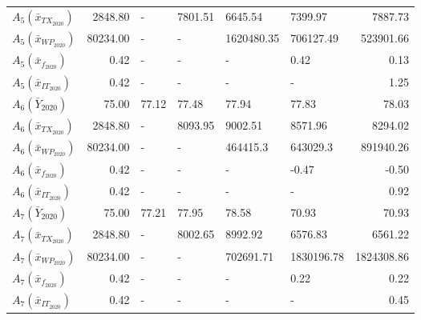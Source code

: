 \begin{tabular}{lrllllr}
 $A_{5}(\bar{x}_{TX_{2020}})$ &  2848.80 &                   - &             7801.51 &             6645.54 &             7399.97 &              7887.73 \\
 $A_{5}(\bar{x}_{WP_{2020}})$ & 80234.00 &                   - &                   - &          1620480.35 &           706127.49 &            523901.66 \\
  $A_{5}(\bar{x}_{f_{2020}})$ &     0.42 &                   - &                   - &                   - &                0.42 &                 0.13 \\
 $A_{5}(\bar{x}_{IT_{2020}})$ &     0.42 &                   - &                   - &                   - &                   - &                 1.25 \\
      $A_{6}(\bar{Y}_{2020})$ &    75.00 &               77.12 &               77.48 &               77.94 &               77.83 &                78.03 \\
 $A_{6}(\bar{x}_{TX_{2020}})$ &  2848.80 &                   - &             8093.95 &             9002.51 &             8571.96 &              8294.02 \\
 $A_{6}(\bar{x}_{WP_{2020}})$ & 80234.00 &                   - &                   - &            464415.3 &            643029.3 &            891940.26 \\
  $A_{6}(\bar{x}_{f_{2020}})$ &     0.42 &                   - &                   - &                   - &               -0.47 &                -0.50 \\
 $A_{6}(\bar{x}_{IT_{2020}})$ &     0.42 &                   - &                   - &                   - &                   - &                 0.92 \\
      $A_{7}(\bar{Y}_{2020})$ &    75.00 &               77.21 &               77.95 &               78.58 &               70.93 &                70.93 \\
 $A_{7}(\bar{x}_{TX_{2020}})$ &  2848.80 &                   - &             8002.65 &             8992.92 &             6576.83 &              6561.22 \\
 $A_{7}(\bar{x}_{WP_{2020}})$ & 80234.00 &                   - &                   - &           702691.71 &          1830196.78 &           1824308.86 \\
  $A_{7}(\bar{x}_{f_{2020}})$ &     0.42 &                   - &                   - &                   - &                0.22 &                 0.22 \\
 $A_{7}(\bar{x}_{IT_{2020}})$ &     0.42 &                   - &                   - &                   - &                   - &                 0.45 \\

\end{tabular}
